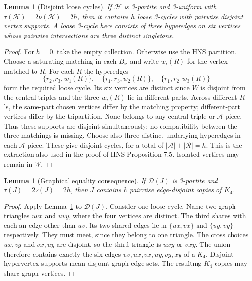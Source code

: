 \documentclass[11pt]{article}
\newtheorem{lemma}[theorem]{Lemma}
\newcommand{\D}{\mathcal D}
\begin{document}
\begin{lemma}[Disjoint loose cycles]\label{lem:cycles}
If $\mathcal H$ is 3-partite and 3-uniform with
$\tau(\mathcal H)=2\nu(\mathcal H)=2h$, then it contains $h$ loose
3-cycles with pairwise disjoint vertex supports. A loose 3-cycle here consists
of three hyperedges on six vertices whose pairwise intersections are three
distinct singletons.
\end{lemma}
\begin{proof}
For $h=0$, take the empty collection. Otherwise use the HNS partition.
Choose a saturating matching in each $B_i$, and write $w_i(R)$ for the
vertex matched to $R$. For each $R$ the hyperedges
\begin{equation}\label{eq:cycles}
\{r_2,r_3,w_1(R)\},\quad
\{r_1,r_3,w_2(R)\},\quad
\{r_1,r_2,w_3(R)\}
\end{equation}
form the required loose cycle. Its six vertices are distinct since
$W$ is disjoint from the central triples and the three $w_i(R)$ lie in
different parts. Across different $R$'s, the same-part chosen vertices
differ by the matching property; different-part vertices differ by the
tripartition. None belongs to any central triple or $\mathcal A$-piece.
Thus these supports are disjoint simultaneously; no compatibility between
the three matchings is missing. Choose also three distinct underlying
hyperedges in each $\mathcal A$-piece. These give disjoint cycles, for a
total of $|\mathcal A|+|\mathcal R|=h$. This is the extraction also used
in the proof of HNS Proposition 7.5. Isolated vertices may remain in $W$.
\end{proof}

\begin{lemma}[Graphical equality consequence]\label{lem:k4}
If $\D(J)$ is 3-partite and $\tau(J)=2\nu(J)=2h$, then $J$ contains
$h$ pairwise edge-disjoint copies of $K_4$.
\end{lemma}
\begin{proof}
Apply Lemma~\ref{lem:cycles} to $\D(J)$. Consider one loose cycle.
Name two graph triangles $uvx$ and $uvy$, where the four vertices are
distinct. The third shares with each an edge other than $uv$.
Its two shared edges lie in $\{ux,vx\}$ and $\{uy,vy\}$, respectively.
They must meet, since they belong to one triangle. The cross choices
$ux,vy$ and $vx,uy$ are disjoint, so the third triangle is $uxy$ or $vxy$.
The union therefore contains exactly the six edges
$uv,ux,vx,uy,vy,xy$ of a $K_4$. Disjoint hypervertex supports mean disjoint
graph-edge sets. The resulting $K_4$ copies may share graph vertices.
\end{proof}
\end{document}
